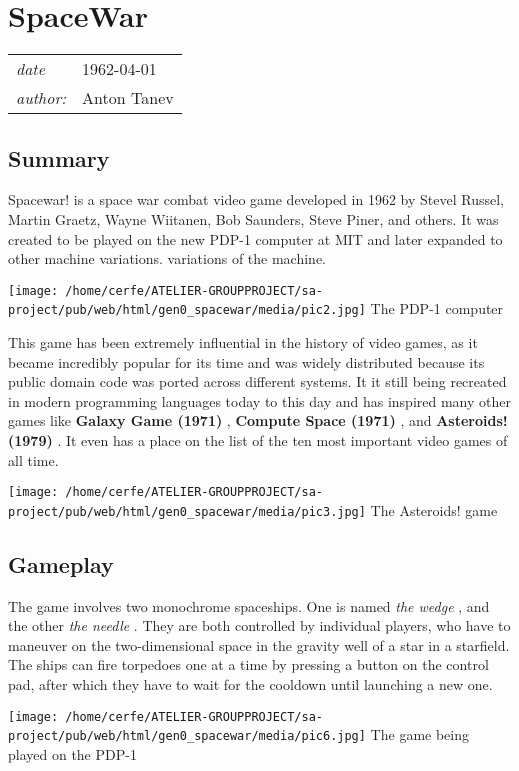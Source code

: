\documentclass[a4paper,10pt]{book}
\newcommand{\pageHeader}[4]{
    \section{#1}
    \vspace{-0.3cm}
    \begin{table}[h!]
     \begin{tabular}{ll}
        \hline
        \textit{date} & #2 \\
        \textit{author: } & #3\\
        \hline
     \end{tabular}
    \end{table}
    \vspace{-0.3cm}
}
\begin{document}
 \newpage\pageHeader{SpaceWar}{1962-04-01}{Anton Tanev}{A space combat video game developed for the PDP-1 minicomputer}
 \subsection{Summary }
 
        Spacewar! is a space war combat video game developed in 1962 by Stevel Russel, Martin Graetz, Wayne Wiitanen,
        Bob Saunders, Steve Piner, and others. It was created to be played on the new PDP-1 computer at MIT and later
        expanded to other machine variations. variations of the machine. 
 
 
 
 \texttt{[image: /home/cerfe/ATELIER-GROUPPROJECT/sa-project/pub/web/html/gen0\_spacewar/media/pic2.jpg]}
 The PDP-1 computer 
 
 
 
        This game has been extremely influential in the history of video games, as it became incredibly popular for its
        time and was widely distributed because its public domain code was ported across different systems. It it still
        being recreated in modern programming languages today  to this day  and has inspired many other games like  \textbf{Galaxy Game (1971) } ,
         \textbf{Compute Space (1971) } , and  \textbf{Asteroids! (1979) } . It even has a place on the list of the ten most important video games of
        all time.
         
 
 
 \texttt{[image: /home/cerfe/ATELIER-GROUPPROJECT/sa-project/pub/web/html/gen0\_spacewar/media/pic3.jpg]}
 The Asteroids! game 
 
 
 \subsection{Gameplay }
 
        The game involves two monochrome spaceships. One is named  \textit{the wedge }, and the other  \textit{the needle }. They are
        both controlled by individual players, who have to maneuver on the two-dimensional space in the gravity well of a star
        in a starfield. The ships can fire torpedoes one at a time by pressing a button on the control pad, after which they have
        to wait for the cooldown until launching a new one.
         
 
 
 \texttt{[image: /home/cerfe/ATELIER-GROUPPROJECT/sa-project/pub/web/html/gen0\_spacewar/media/pic6.jpg]}
 The game being played on the PDP-1 
 
\end{document}
